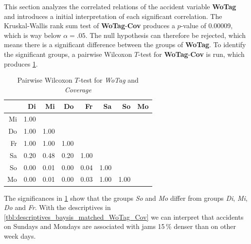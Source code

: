 This section analyzes the correlated relations of the accident variable \textbf{WoTag} and introduces a initial interpretation of each significant correlation. The Kruskal-Wallis rank sum test of \textbf{WoTag}-\textbf{Cov} produces a $p$-value of 0.00009, which is way below $\alpha=.05$. The null hypothesis can therefore be rejected, which means there is a significant difference between the groups of \textbf{WoTag}. To identify the significant groups, a pairwise Wilcoxon $T$-test for \textbf{WoTag}-\textbf{Cov} is run, which produces \cref{tbl:wilcoxon_baysis_matched_WoTag_Cov}. 
\begin{table}[ht!]
	\tiny
	\centering
    \begin{tabular}{rrrrrrrr}
        \toprule
        & Di & Mi & Do & Fr & Sa & So & Mo \\ 
        \midrule
        Mi & 1.00 &  &  &  &  &  &  \\ 
        Do & 1.00 & 1.00 &  &  &  &  &  \\ 
        Fr & 1.00 & 1.00 & 1.00 &  &  &  &  \\ 
        Sa & 0.20 & 0.48 & 0.20 & 1.00 &  &  &  \\ 
        So & 0.00 & 0.01 & 0.00 & 0.04 & 1.00 &  &  \\ 
        Mo & 0.00 & 0.01 & 0.00 & 0.03 & 1.00 & 1.00 &  \\ 
        \bottomrule
      \end{tabular}
	\caption{Pairwise Wilcoxon $T$-test for \textit{WoTag} and \textit{Coverage}}
	\label{tbl:wilcoxon_baysis_matched_WoTag_Cov}
\end{table}
The significances in \cref{tbl:wilcoxon_baysis_matched_WoTag_Cov} show that the groups \textit{So} and \textit{Mo} differ from groups \textit{Di}, \textit{Mi}, \textit{Do} and \textit{Fr}. With the descriptives in \cref{tbl:descriptives_baysis_matched_WoTag_Cov} we can interpret that accidents on Sundays and Mondays are associated with jams 15\,\% denser than on other week days.
